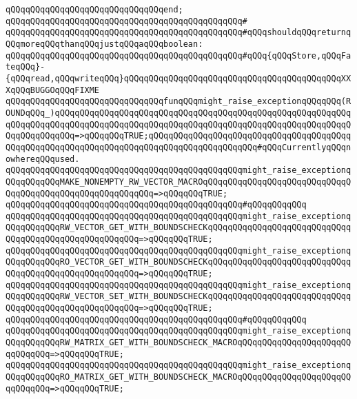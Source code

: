 \verb|qQQqqQQqqQQqqQQqqQQqqQQqqQQqqQQqend;|\newline
\verb|qQQqqQQqqQQqqQQqqQQqqQQqqQQqqQQqqQQqqQQqqQQqqQQq#|\newline
\verb|qQQqqQQqqQQqqQQqqQQqqQQqqQQqqQQqqQQqqQQqqQQqqQQq#qQQqshouldqQQqreturnqQQqmoreqQQqthanqQQqjustqQQqaqQQqboolean:|\newline
\verb|qQQqqQQqqQQqqQQqqQQqqQQqqQQqqQQqqQQqqQQqqQQqqQQq#qQQq{qQQqStore,qQQqFateqQQq}-{qQQqread,qQQqwriteqQQq}qQQqqQQqqQQqqQQqqQQqqQQqqQQqqQQqqQQqqQQqqQQqXXXqQQqBUGGOqQQqFIXME|\newline
\newline
\newline
\verb|qQQqqQQqqQQqqQQqqQQqqQQqqQQqqQQqfunqQQqmight_raise_exceptionqQQqqQQq(ROUNDqQQq_)qQQqqQQqqQQqqQQqqQQqqQQqqQQqqQQqqQQqqQQqqQQqqQQqqQQqqQQqqQQqqQQqqQQqqQQqqQQqqQQqqQQqqQQqqQQqqQQqqQQqqQQqqQQqqQQqqQQqqQQqqQQqqQQqqQQqqQQqqQQqqQQq=>qQQqqQQqTRUE;qQQqqQQqqQQqqQQqqQQqqQQqqQQqqQQqqQQqqQQqqQQqqQQqqQQqqQQqqQQqqQQqqQQqqQQqqQQqqQQqqQQqqQQqqQQq#qQQqCurrentlyqQQqnowhereqQQqused.|\newline
\verb|qQQqqQQqqQQqqQQqqQQqqQQqqQQqqQQqqQQqqQQqqQQqqQQqmight_raise_exceptionqQQqqQQqqQQqMAKE_NONEMPTY_RW_VECTOR_MACROqQQqqQQqqQQqqQQqqQQqqQQqqQQqqQQqqQQqqQQqqQQqqQQqqQQqqQQqqQQq=>qQQqqQQqTRUE;|\newline
\verb|qQQqqQQqqQQqqQQqqQQqqQQqqQQqqQQqqQQqqQQqqQQqqQQq#qQQqqQQqqQQq|\newline
\verb|qQQqqQQqqQQqqQQqqQQqqQQqqQQqqQQqqQQqqQQqqQQqqQQqmight_raise_exceptionqQQqqQQqqQQqRW_VECTOR_GET_WITH_BOUNDSCHECKqQQqqQQqqQQqqQQqqQQqqQQqqQQqqQQqqQQqqQQqqQQqqQQqqQQqqQQq=>qQQqqQQqTRUE;|\newline
\verb|qQQqqQQqqQQqqQQqqQQqqQQqqQQqqQQqqQQqqQQqqQQqqQQqmight_raise_exceptionqQQqqQQqqQQqRO_VECTOR_GET_WITH_BOUNDSCHECKqQQqqQQqqQQqqQQqqQQqqQQqqQQqqQQqqQQqqQQqqQQqqQQqqQQqqQQq=>qQQqqQQqTRUE;|\newline
\verb|qQQqqQQqqQQqqQQqqQQqqQQqqQQqqQQqqQQqqQQqqQQqqQQqmight_raise_exceptionqQQqqQQqqQQqRW_VECTOR_SET_WITH_BOUNDSCHECKqQQqqQQqqQQqqQQqqQQqqQQqqQQqqQQqqQQqqQQqqQQqqQQqqQQqqQQq=>qQQqqQQqTRUE;|\newline
\verb|qQQqqQQqqQQqqQQqqQQqqQQqqQQqqQQqqQQqqQQqqQQqqQQq#qQQqqQQqqQQq|\newline
\verb|qQQqqQQqqQQqqQQqqQQqqQQqqQQqqQQqqQQqqQQqqQQqqQQqmight_raise_exceptionqQQqqQQqqQQqRW_MATRIX_GET_WITH_BOUNDSCHECK_MACROqQQqqQQqqQQqqQQqqQQqqQQqqQQqqQQq=>qQQqqQQqTRUE;|\newline
\verb|qQQqqQQqqQQqqQQqqQQqqQQqqQQqqQQqqQQqqQQqqQQqqQQqmight_raise_exceptionqQQqqQQqqQQqRO_MATRIX_GET_WITH_BOUNDSCHECK_MACROqQQqqQQqqQQqqQQqqQQqqQQqqQQqqQQq=>qQQqqQQqTRUE;|\newline
